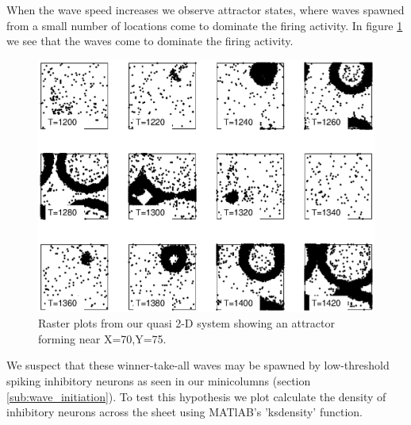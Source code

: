 When the wave speed increases we observe attractor states, where waves spawned from a small number of locations come to dominate the firing activity.
In figure \ref{fig:2DWaveRasters_attractor} we see that the waves come to dominate the firing activity.
\begin{figure}[!htb]
 \caption{ Raster plots from our quasi 2-D system showing an attractor forming near X=70,Y=75.}
 \label{fig:2DWaveRasters_attractor}
 \centering
   \includegraphics[width=\textwidth]{fig/2DWaveRasters_Attractor_kappa0p1_seed35}
\end{figure}
We suspect that these winner-take-all waves may be spawned by low-threshold spiking inhibitory neurons as seen in our minicolumns (section \ref{sub:wave_initiation}).
To test this hypothesis we plot calculate the density of inhibitory neurons across the sheet using MATlAB's 'ksdensity' function.
